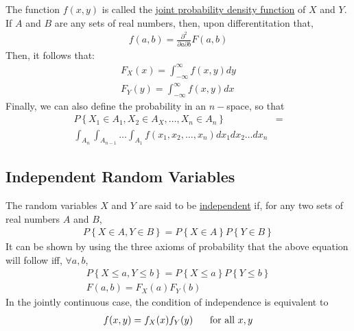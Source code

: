 \documentclass[a4paper]{article}
\begin{document}
The function $f(x,y)$ is called the \underline{joint probability density function} of $X$ and $Y$. If $A$ and $B$ are any sets of real numbers, then, upon differentitation that,
\begin{align}
  f(a,b)  = \frac{\partial^2}{\partial a\partial b}F(a,b)
\end{align}
Then, it follows that:
\begin{align}
  F_X(x) = \int_{-\infty}^{\infty} f(x,y) dy \\
  F_Y(y) = \int_{-\infty}^{\infty} f(x,y) dx 
\end{align}
Finally, we can also define the probability in an $n-$space, so that 
\begin{align}
  P\left\{ X_1 \in A_1, X_2 \in A_X, \dots, X_n \in A_n \right\} & = \\ \int_{A_n}\int_{A_{n-1}}\dots \int_{A_1} f(x_1,x_2,\dots,x_n) dx_1 dx_2\dots dx_n
\end{align}
\subsection{Independent Random Variables} %
\label{sub:Independent Random Variables}
The random variables $X$ and $Y$ are said to be \underline{independent} if, for any two sets of real numbers $A$ and $B$,
\begin{align}
  P\left\{ X \in A, Y \in B \right\} = P\left\{ X \in A \right\} P\left\{ Y \in B \right\} 
\end{align}
It can be shown by using the three axioms of probability that the above equation will follow iff, $\forall a,b$,
\begin{align}
  P\left\{ X \leq a, Y \leq b \right\}= P\left\{ X \leq a \right\}P\left\{  Y \leq b \right\} \\
  F(a,b) = F_X(a)F_Y(b) 
\end{align}
In the jointly continuous case, the condition of independence is equivalent to
\begin{align}
  f(x,y) = f_X(x)f_Y(y) \hspace{.5 cm} \text{ for all } x,y
\end{align}
\end{document}
